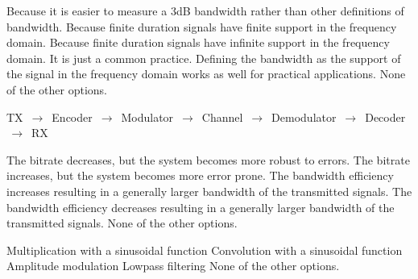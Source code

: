 \begin{questions}

    \begin{checkboxes}
        \choice Because it is easier to measure a 3dB bandwidth rather than other definitions of bandwidth.
        \CorrectChoice Because finite duration signals have finite support in the frequency domain.
        \choice Because finite duration signals have infinite support in the frequency domain.
        \choice It is just a common practice. Defining the bandwidth as the support of the signal in the frequency domain works as well for practical
        applications.
        \choice None of the other options.
    \end{checkboxes}



    \begin{solution}
        TX $\,\to\,$ Encoder $\,\to\,$ Modulator  $\,\to\,$ Channel  $\,\to\,$ Demodulator  $\,\to\,$ Decoder  $\,\to\,$ RX
    \end{solution}

    \begin{checkboxes}
        \choice The bitrate decreases, but the system becomes more robust to errors.
        \CorrectChoice The bitrate increases, but the system becomes more error prone.
        \choice The bandwidth efficiency increases resulting in a generally larger bandwidth of the transmitted signals.
        \choice The bandwidth efficiency decreases resulting in a generally larger bandwidth of the transmitted signals.
        \choice None of the other options.
    \end{checkboxes}

    \begin{checkboxes}
        \CorrectChoice Multiplication with a sinusoidal function
        \choice Convolution with a sinusoidal function
        \choice Amplitude modulation
        \choice Lowpass filtering
        \choice None of the other options.
    \end{checkboxes}



\end{questions}
